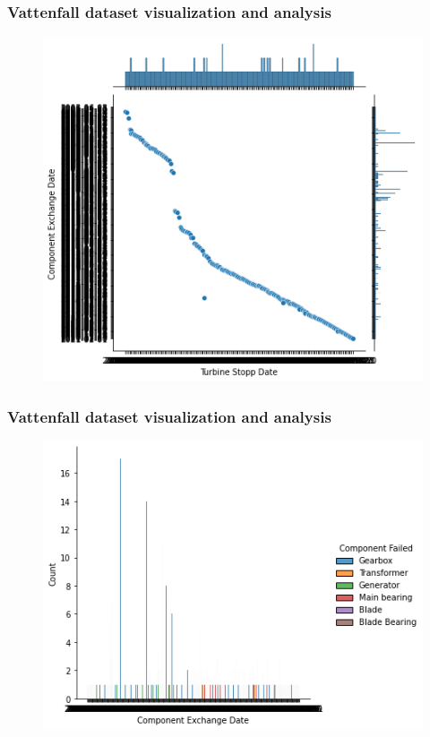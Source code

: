 \documentclass{beamer}
\begin{document}
\begin{frame}[fragile] %
\frametitle{Vattenfall dataset visualization and analysis}


\begin{example} 


\end{example}

\begin{figure}
\includegraphics[width=0.6\linewidth]{Seminar_3_images/Python/06.png}
\end{figure}

\end{frame}
\begin{frame}[fragile] %
\frametitle{Vattenfall dataset visualization and analysis}


\begin{example} ["Component Exchange Date "vs  hue="Component Failed"]


\end{example}

\begin{figure}
\includegraphics[width=0.6\linewidth]{Seminar_3_images/Python/07.png}
\end{figure}

\end{frame}
\end{document}
